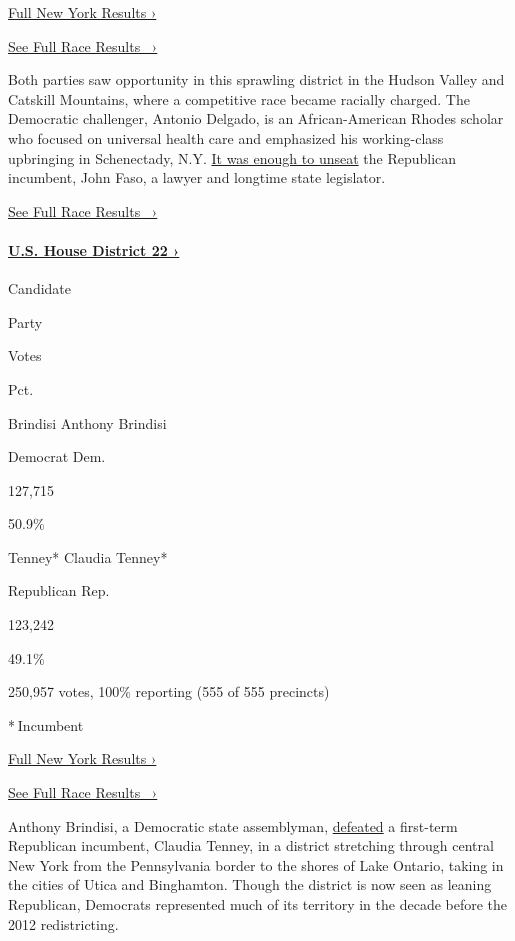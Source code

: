 \href{https://www.nytimes3xbfgragh.onion/interactive/2018/11/06/us/elections/results-new-york-elections.html}{Full
New York Results ›}

\href{https://www.nytimes3xbfgragh.onion/elections/results/new-york-house-district-19}{See
Full Race Results~ ›}

Both parties saw opportunity in this sprawling district in the Hudson
Valley and Catskill Mountains, where a competitive race became racially
charged. The Democratic challenger, Antonio Delgado, is an
African-American Rhodes scholar who focused on universal health care and
emphasized his working-class upbringing in Schenectady, N.Y.
\href{https://www.nytimes3xbfgragh.onion/2018/11/07/nyregion/senate-house-race.html}{It
was enough to unseat} the Republican incumbent, John Faso, a lawyer and
longtime state legislator.

\href{https://www.nytimes3xbfgragh.onion/elections/results/new-york-house-district-19}{See
Full Race Results~ ›}

\hypertarget{us-house-district-22-}{%
\paragraph{\texorpdfstring{\href{https://www.nytimes3xbfgragh.onion/elections/results/new-york-house-district-22}{U.S.
House District 22
›}}{U.S. House District 22 ›}}\label{us-house-district-22-}}

Candidate

Party

Votes

Pct.

 Brindisi Anthony Brindisi

Democrat Dem.

127,715

50.9\%

 Tenney* Claudia Tenney*

Republican Rep.

123,242

49.1\%

250,957 votes, 100\% reporting (555 of 555 precincts)

* Incumbent

\href{https://www.nytimes3xbfgragh.onion/interactive/2018/11/06/us/elections/results-new-york-elections.html}{Full
New York Results ›}

\href{https://www.nytimes3xbfgragh.onion/elections/results/new-york-house-district-22}{See
Full Race Results~ ›}

Anthony Brindisi, a Democratic state assemblyman,
\href{https://www.nytimes3xbfgragh.onion/2018/11/07/nyregion/senate-house-race.html}{defeated}
a first-term Republican incumbent, Claudia Tenney, in a district
stretching through central New York from the Pennsylvania border to the
shores of Lake Ontario, taking in the cities of Utica and Binghamton.
Though the district is now seen as leaning Republican, Democrats
represented much of its territory in the decade before the 2012
redistricting.

